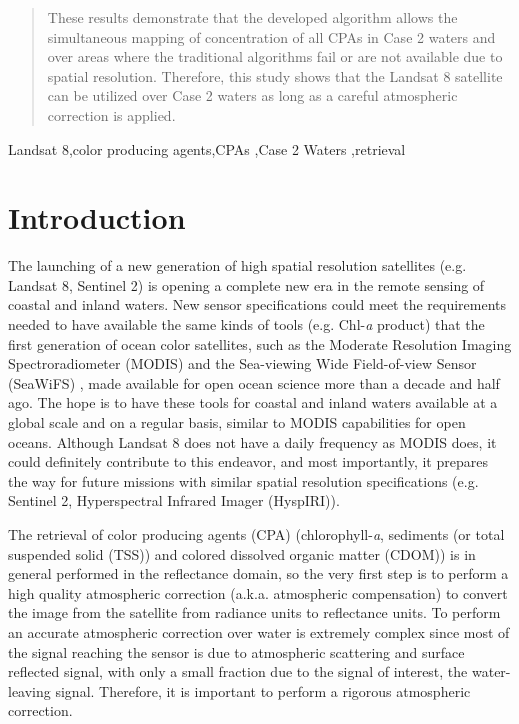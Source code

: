 \documentclass[onecolumn,3p,letterpaper,11pt]{elsarticle}
\begin{document}
\begin{frontmatter}
\begin{abstract}
These results demonstrate that the developed algorithm allows the simultaneous mapping of concentration of all CPAs in Case 2 waters and over areas where the traditional algorithms fail or are not available due to spatial resolution.
%
Therefore, this study shows that the Landsat 8 satellite can be utilized over Case 2 waters as long as a careful atmospheric correction is applied. 

\end{abstract}

\begin{keyword}
Landsat 8\sep color producing agents\sep CPAs \sep Case 2 Waters \sep retrieval
\end{keyword}

\end{frontmatter}
\section{Introduction}
The launching of a new generation of high spatial resolution satellites (e.g. Landsat 8, Sentinel 2) is opening a complete new era in the remote sensing of coastal and inland waters. New sensor specifications could meet the requirements needed to have available the same kinds of tools (e.g. Chl-{\it a} product) that the first generation of ocean color satellites, such as the Moderate Resolution Imaging Spectroradiometer (MODIS) \citep{Esaias1998} and the Sea-viewing Wide Field-of-view Sensor (SeaWiFS) \citep{McClain2004}, made available for open ocean science more than a decade and half ago. The hope is to have these tools for coastal and inland waters available at a global scale and on a regular basis, similar to MODIS capabilities for open oceans. Although Landsat 8 does not have a daily frequency as MODIS does, it could definitely contribute to this endeavor, and most importantly, it prepares the way for future missions with similar spatial resolution specifications (e.g. Sentinel 2, Hyperspectral Infrared Imager (HyspIRI)).

The retrieval of color producing agents (CPA) (chlorophyll-{\it a}, sediments (or total suspended solid (TSS)) and colored dissolved organic matter (CDOM)) is in general performed in the reflectance domain, so the very first step is to perform a high quality atmospheric correction (a.k.a. atmospheric compensation) to convert the image from the satellite from radiance units to reflectance units. To perform an accurate atmospheric correction over water is extremely complex since most of the signal reaching the sensor is due to atmospheric scattering and surface reflected signal, with only a small fraction due to the signal of interest, the water-leaving signal. Therefore, it is important to perform a rigorous atmospheric correction. 
\end{document}
